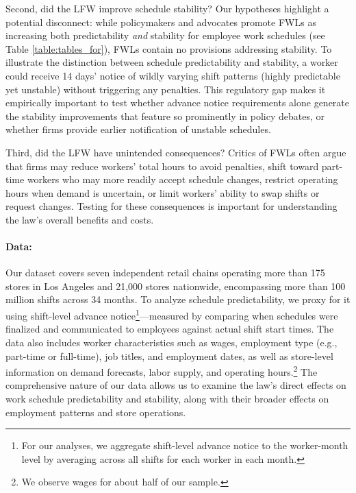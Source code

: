 \documentclass[letterpaper,11pt,leqno]{article}
\theoremstyle{paper}
\begin{document}
Second, did the LFW improve schedule stability? Our hypotheses highlight a potential disconnect: while policymakers and advocates promote FWLs as increasing both predictability \textit{and} stability for employee work schedules (see Table \ref{table:tables_for}), FWLs contain no provisions addressing stability. To illustrate the distinction between schedule predictability and stability, a worker could receive 14 days' notice of wildly varying shift patterns (highly predictable yet unstable) without triggering any penalties. This regulatory gap makes it empirically important to test whether advance notice requirements alone generate the stability improvements that feature so prominently in policy debates, or whether firms provide earlier notification of unstable schedules.

Third, did the LFW have unintended consequences? Critics of FWLs often argue that firms may reduce workers' total hours to avoid penalties, shift toward part-time workers who may more readily accept schedule changes, restrict operating hours when demand is uncertain, or limit workers' ability to swap shifts or request changes. Testing for these consequences is important for understanding the law's overall benefits and costs. 

\paragraph{Data:}
Our dataset covers seven independent retail chains operating more than 175 stores in Los Angeles and 21,000 stores nationwide, encompassing more than 100 million shifts across 34 months. To analyze schedule predictability, we proxy for it using shift-level advance notice\footnote{For our analyses, we aggregate shift-level advance notice to the worker-month level by averaging across all shifts for each worker in each month.}—measured by comparing when schedules were finalized and communicated to employees against actual shift start times. The data also includes worker characteristics such as wages, employment type (e.g., part-time or full-time), job titles, and employment dates, as well as store-level information on demand forecasts, labor supply, and operating hours.\footnote{We observe wages for about half of our sample.} The comprehensive nature of our data allows us to examine the law's direct effects on work schedule predictability and stability, along with their broader effects on employment patterns and store operations.
\end{document}
